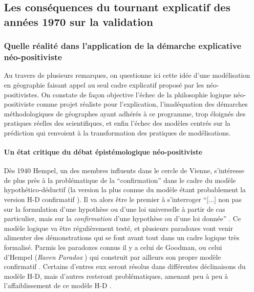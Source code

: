 
\subsection{Les conséquences du tournant explicatif des années 1970 sur la validation}
\label{ssec:transition_annee70}

\subsubsection{Quelle réalité dans l'application de la démarche explicative néo-positiviste}
\label{sssec:realite_neopositiviste}

Au travers de plusieurs remarques, on questionne ici cette idée d'une modélisation en géographie faisant appel au seul cadre explicatif proposé par les néo-positivistes. On constate de façon objective l'échec de la philosophie logique néo-positiviste comme projet réaliste pour l'explication, l'inadéquation des démarches méthodologiques de géographes ayant adhérés à ce programme, trop éloignés des pratiques réelles des scientifiques, et enfin l’échec des modèles centrés sur la prédiction qui renvoient à la transformation des pratiques de modélisations.

\paragraph{Un état critique du débat épistémologique néo-positiviste}
\label{p:critique_debat}

Dès 1940 Hempel, un des membres influents dans le cercle de Vienne, s'intéresse de plus près à la problématique de la \enquote{confirmation}  dans le cadre du modèle hypothético-déductif (la version la plus connue du modèle étant probablement la version H-D confirmatif ). Il va alors être le premier à s'interroger \enquote{[...] non pas sur la formulation d'une hypothèse ou d'une loi universelle à partir de cas particulier, mais sur la \textit{confirmation} d'une hypothèse ou d'une loi donnée} \autocite{Lecourt2006}. Ce modèle logique va être régulièrement testé, et plusieurs paradoxes vont venir alimenter des démonstrations qui se font avant tout dans un cadre logique très formalisé. Parmis les paradoxes connus il y a celui de Goodman, ou celui d'Hempel (\textit{Raven Paradox}  ) qui construit par ailleurs son propre modèle confirmatif \autocites{Cozic2009, Crupi2015}. Certains d'entres eux seront résolus dans différentes déclinaisons du modèle H-D, mais d'autres resteront problématiques, amenant peu à peu à l'affaiblissement de ce modèle H-D . %


